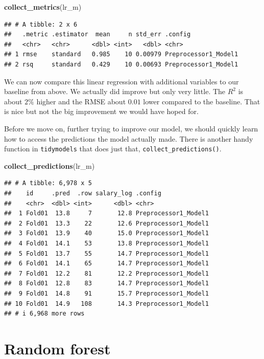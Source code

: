 \documentclass[
]{book}
\newenvironment{Shaded}{\begin{snugshade}}{\end{snugshade}}
\newcommand{\FunctionTok}[1]{\textcolor[rgb]{0.13,0.29,0.53}{\textbf{#1}}}
\newcommand{\NormalTok}[1]{#1}
\begin{document}
\begin{Shaded}
\begin{Highlighting}[]
\FunctionTok{collect\_metrics}\NormalTok{(lr\_m)}
\end{Highlighting}
\end{Shaded}

\begin{verbatim}
## # A tibble: 2 x 6
##   .metric .estimator  mean     n std_err .config             
##   <chr>   <chr>      <dbl> <int>   <dbl> <chr>               
## 1 rmse    standard   0.985    10 0.00979 Preprocessor1_Model1
## 2 rsq     standard   0.429    10 0.00693 Preprocessor1_Model1
\end{verbatim}

We can now compare this linear regression with additional variables to our
baseline from above. We actually did improve but only very little. The \(R^2\) is
about \(2\%\) higher and the RMSE about \(0.01\) lower compared to the baseline.
That is nice but not the big improvement we would have hoped for.

Before we move on, further trying to improve our model, we should quickly learn
how to access the predictions the model actually made. There is another handy
function in \texttt{tidymodels} that does just that, \texttt{collect\_predictions()}.

\begin{Shaded}
\begin{Highlighting}[]
\FunctionTok{collect\_predictions}\NormalTok{(lr\_m)}
\end{Highlighting}
\end{Shaded}

\begin{verbatim}
## # A tibble: 6,978 x 5
##    id     .pred  .row salary_log .config             
##    <chr>  <dbl> <int>      <dbl> <chr>               
##  1 Fold01  13.8     7       12.8 Preprocessor1_Model1
##  2 Fold01  13.3    22       12.6 Preprocessor1_Model1
##  3 Fold01  13.9    40       15.0 Preprocessor1_Model1
##  4 Fold01  14.1    53       13.8 Preprocessor1_Model1
##  5 Fold01  13.7    55       14.7 Preprocessor1_Model1
##  6 Fold01  14.1    65       14.7 Preprocessor1_Model1
##  7 Fold01  12.2    81       12.2 Preprocessor1_Model1
##  8 Fold01  12.8    83       14.7 Preprocessor1_Model1
##  9 Fold01  14.8    91       15.7 Preprocessor1_Model1
## 10 Fold01  14.9   108       14.3 Preprocessor1_Model1
## # i 6,968 more rows
\end{verbatim}

\hypertarget{random-forest}{%
\section{Random forest}\label{random-forest}}
\end{document}
